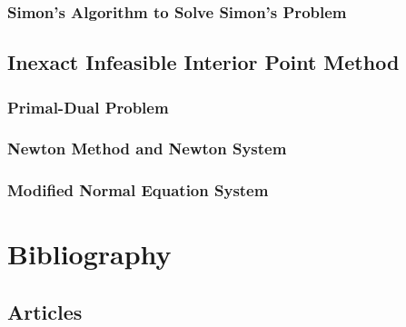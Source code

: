 \documentclass[
	11pt, %
	a4paper, %
]{LegrandOrangeBook}
\begin{document}
\subsection{Simon's Algorithm to Solve Simon's Problem}


\section{Inexact Infeasible Interior Point Method}
\subsection{Primal-Dual Problem}


\subsection{Newton Method and Newton System}


\subsection{Modified Normal Equation System}



\chapter*{Bibliography}

\section*{Articles}
\end{document}
